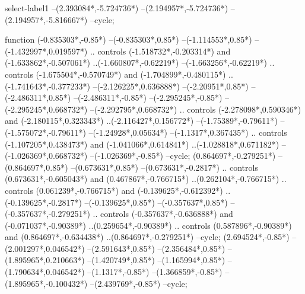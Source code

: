 {\begin{scope}[x=1mm,y=1mm,line width=\SCstroke mm,line cap=round,line join=round]
\begin{SCpart}{select-label1}
--({2.393084*\SCF},{-5.724736*\SCF})
--({2.194957*\SCF},{-5.724736*\SCF})
--({2.194957*\SCF},{-5.816667*\SCF})
--cycle;
\end{SCpart}
\begin{SCpart}{function}
 ({-0.835303*\SCF},{-0.85*\SCF})
--({-0.835303*\SCF},{0.85*\SCF})
--({-1.114553*\SCF},{0.85*\SCF})
--({-1.432997*\SCF},{0.019597*\SCF})
.. controls ({-1.518732*\SCF},{-0.203314*\SCF}) and ({-1.633862*\SCF},{-0.507061*\SCF}) ..({-1.660807*\SCF},{-0.62219*\SCF})
--({-1.663256*\SCF},{-0.62219*\SCF})
.. controls ({-1.675504*\SCF},{-0.570749*\SCF}) and ({-1.704899*\SCF},{-0.480115*\SCF}) ..({-1.741643*\SCF},{-0.377233*\SCF})
--({-2.126225*\SCF},{0.636888*\SCF})
--({-2.20951*\SCF},{0.85*\SCF})
--({-2.486311*\SCF},{0.85*\SCF})
--({-2.486311*\SCF},{-0.85*\SCF})
--({-2.295245*\SCF},{-0.85*\SCF})
--({-2.295245*\SCF},{0.668732*\SCF})
--({-2.292795*\SCF},{0.668732*\SCF})
.. controls ({-2.278098*\SCF},{0.590346*\SCF}) and ({-2.180115*\SCF},{0.323343*\SCF}) ..({-2.116427*\SCF},{0.156772*\SCF})
--({-1.75389*\SCF},{-0.79611*\SCF})
--({-1.575072*\SCF},{-0.79611*\SCF})
--({-1.24928*\SCF},{0.05634*\SCF})
--({-1.1317*\SCF},{0.367435*\SCF})
.. controls ({-1.107205*\SCF},{0.438473*\SCF}) and ({-1.041066*\SCF},{0.614841*\SCF}) ..({-1.028818*\SCF},{0.671182*\SCF})
--({-1.026369*\SCF},{0.668732*\SCF})
--({-1.026369*\SCF},{-0.85*\SCF})
--cycle;
 ({0.864697*\SCF},{-0.279251*\SCF})
--({0.864697*\SCF},{0.85*\SCF})
--({0.673631*\SCF},{0.85*\SCF})
--({0.673631*\SCF},{-0.2817*\SCF})
.. controls ({0.673631*\SCF},{-0.605043*\SCF}) and ({0.467867*\SCF},{-0.766715*\SCF}) ..({0.262104*\SCF},{-0.766715*\SCF})
.. controls ({0.061239*\SCF},{-0.766715*\SCF}) and ({-0.139625*\SCF},{-0.612392*\SCF}) ..({-0.139625*\SCF},{-0.2817*\SCF})
--({-0.139625*\SCF},{0.85*\SCF})
--({-0.357637*\SCF},{0.85*\SCF})
--({-0.357637*\SCF},{-0.279251*\SCF})
.. controls ({-0.357637*\SCF},{-0.636888*\SCF}) and ({-0.071037*\SCF},{-0.90389*\SCF}) ..({0.259654*\SCF},{-0.90389*\SCF})
.. controls ({0.587896*\SCF},{-0.90389*\SCF}) and ({0.864697*\SCF},{-0.634438*\SCF}) ..({0.864697*\SCF},{-0.279251*\SCF})
--cycle;
 ({2.694524*\SCF},{-0.85*\SCF})
--({2.001297*\SCF},{0.046542*\SCF})
--({2.591643*\SCF},{0.85*\SCF})
--({2.356484*\SCF},{0.85*\SCF})
--({1.895965*\SCF},{0.210663*\SCF})
--({1.420749*\SCF},{0.85*\SCF})
--({1.165994*\SCF},{0.85*\SCF})
--({1.790634*\SCF},{0.046542*\SCF})
--({1.1317*\SCF},{-0.85*\SCF})
--({1.366859*\SCF},{-0.85*\SCF})
--({1.895965*\SCF},{-0.100432*\SCF})
--({2.439769*\SCF},{-0.85*\SCF})
--cycle;
\end{SCpart}
\end{scope}
}
